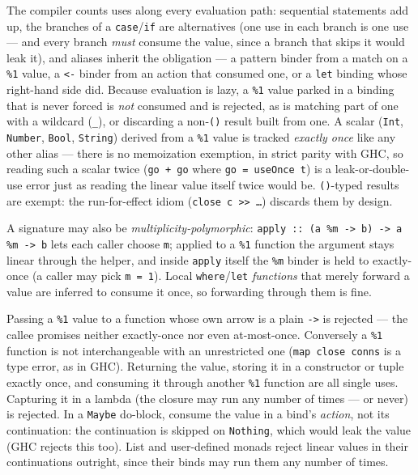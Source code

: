 \documentclass[11pt,a4paper]{article}
\begin{document}
The compiler counts uses along every evaluation path: sequential
statements add up, the branches of a \texttt{case}/\texttt{if} are
alternatives (one use in each branch is one use --- and every branch
\emph{must} consume the value, since a branch that skips it would leak
it), and aliases inherit the obligation --- a pattern binder from a
match on a \texttt{\%1} value, a \texttt{<-} binder from an action that
consumed one, or a \texttt{let} binding whose right-hand side did.
Because evaluation is lazy, a \texttt{\%1} value parked in a binding
that is never forced is \emph{not} consumed and is rejected, as is
matching part of one with a wildcard (\texttt{\_}), or discarding a
non-\texttt{()} result built from one. A scalar (\texttt{Int},
\texttt{Number}, \texttt{Bool}, \texttt{String}) derived from a
\texttt{\%1} value is tracked \emph{exactly once} like any other alias
--- there is no memoization exemption, in strict parity with GHC, so
reading such a scalar twice (\texttt{go + go} where
\texttt{go = useOnce t}) is a leak-or-double-use error just as reading
the linear value itself twice would be. \texttt{()}-typed results are
exempt: the run-for-effect idiom (\texttt{close c >> \dots}) discards
them by design.

A signature may also be \emph{multiplicity-polymorphic}:
\texttt{apply :: (a \%m -> b) -> a \%m -> b} lets each caller choose
\texttt{m}; applied to a \texttt{\%1} function the argument stays
linear through the helper, and inside \texttt{apply} itself the
\texttt{\%m} binder is held to exactly-once (a caller may pick
\texttt{m = 1}). Local \texttt{where}/\texttt{let} \emph{functions}
that merely forward a value are inferred to consume it once, so
forwarding through them is fine.

Passing a \texttt{\%1} value to a function whose own arrow is a plain
\texttt{->} is rejected --- the callee promises neither
exactly-once nor even at-most-once. Conversely a \texttt{\%1} function
is not interchangeable with an unrestricted one (\texttt{map close
conns} is a type error, as in GHC). Returning the value, storing it in
a constructor or tuple exactly once, and consuming it through another
\texttt{\%1} function are all single uses. Capturing it in a lambda
(the closure may run any number of times --- or never) is rejected. In
a \texttt{Maybe} do-block, consume the value in a bind's \emph{action},
not its continuation: the continuation is skipped on \texttt{Nothing},
which would leak the value (GHC rejects this too). List and
user-defined monads reject linear values in their continuations
outright, since their binds may run them any number of times.
\end{document}
